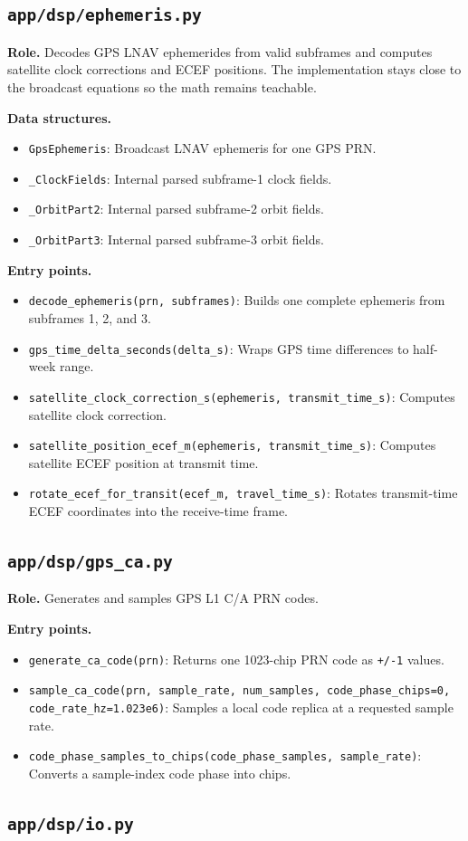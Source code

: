 \documentclass[11pt,a4paper]{article}
\newcommand{\codepath}[1]{\nolinkurl{#1}}
\newcommand{\codeheading}[1]{\texorpdfstring{\codepath{#1}}{#1}}
\newcommand{\codesym}[1]{\nolinkurl{#1}}
\newcommand{\apiitem}[2]{\item \codesym{#1}: #2}
\begin{document}
\subsection{\codeheading{app/dsp/ephemeris.py}}

\textbf{Role.} Decodes GPS LNAV ephemerides from valid subframes and computes satellite clock corrections and ECEF positions. The implementation stays close to the broadcast equations so the math remains teachable.

\textbf{Data structures.}
\begin{itemize}
  \apiitem{GpsEphemeris}{Broadcast LNAV ephemeris for one GPS PRN.}
  \apiitem{\_ClockFields}{Internal parsed subframe-1 clock fields.}
  \apiitem{\_OrbitPart2}{Internal parsed subframe-2 orbit fields.}
  \apiitem{\_OrbitPart3}{Internal parsed subframe-3 orbit fields.}
\end{itemize}

\textbf{Entry points.}
\begin{itemize}
  \apiitem{decode_ephemeris(prn, subframes)}{Builds one complete ephemeris from subframes 1, 2, and 3.}
  \apiitem{gps_time_delta_seconds(delta_s)}{Wraps GPS time differences to half-week range.}
  \apiitem{satellite_clock_correction_s(ephemeris, transmit_time_s)}{Computes satellite clock correction.}
  \apiitem{satellite_position_ecef_m(ephemeris, transmit_time_s)}{Computes satellite ECEF position at transmit time.}
  \apiitem{rotate_ecef_for_transit(ecef_m, travel_time_s)}{Rotates transmit-time ECEF coordinates into the receive-time frame.}
\end{itemize}

\subsection{\codeheading{app/dsp/gps_ca.py}}

\textbf{Role.} Generates and samples GPS L1 C/A PRN codes.

\textbf{Entry points.}
\begin{itemize}
  \apiitem{generate_ca_code(prn)}{Returns one 1023-chip PRN code as \texttt{+/-1} values.}
  \apiitem{sample_ca_code(prn, sample_rate, num_samples, code_phase_chips=0, code_rate_hz=1.023e6)}{Samples a local code replica at a requested sample rate.}
  \apiitem{code_phase_samples_to_chips(code_phase_samples, sample_rate)}{Converts a sample-index code phase into chips.}
\end{itemize}

\subsection{\codeheading{app/dsp/io.py}}
\end{document}
